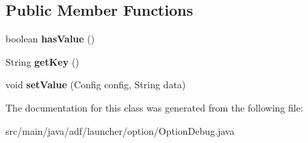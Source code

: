 \subsection*{Public Member Functions}
\begin{DoxyCompactItemize}
\item 
\hypertarget{classadf_1_1launcher_1_1option_1_1OptionDebug_a50e3dfa02807810da389fcf1180813c3}{}\label{classadf_1_1launcher_1_1option_1_1OptionDebug_a50e3dfa02807810da389fcf1180813c3} 
boolean {\bfseries has\+Value} ()
\item 
\hypertarget{classadf_1_1launcher_1_1option_1_1OptionDebug_a4554331694ccee9672befc791354ee62}{}\label{classadf_1_1launcher_1_1option_1_1OptionDebug_a4554331694ccee9672befc791354ee62} 
String {\bfseries get\+Key} ()
\item 
\hypertarget{classadf_1_1launcher_1_1option_1_1OptionDebug_ad4993fa279ccdba290b8f75ec16429ca}{}\label{classadf_1_1launcher_1_1option_1_1OptionDebug_ad4993fa279ccdba290b8f75ec16429ca} 
void {\bfseries set\+Value} (Config config, String data)
\end{DoxyCompactItemize}


The documentation for this class was generated from the following file\+:\begin{DoxyCompactItemize}
\item 
src/main/java/adf/launcher/option/Option\+Debug.\+java\end{DoxyCompactItemize}
